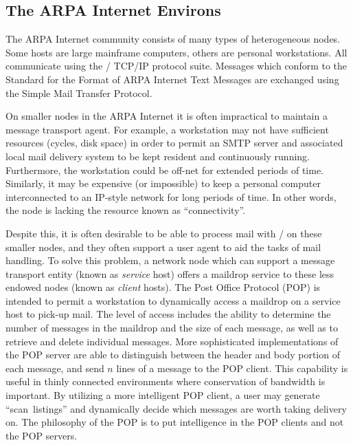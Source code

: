 \subsection{The ARPA Internet Environs}		%
The ARPA Internet community consists of many types of heterogeneous nodes.
Some hosts are large mainframe computers,
others are personal workstations.
All communicate using the \milstd/ TCP/IP protocol suite\cite{IP,TCP}.
Messages which conform to the Standard for the Format of ARPA Internet Text
Messages\cite{DCroc82}
are exchanged using the Simple Mail Transfer Protocol\cite{SMTP}.

On smaller nodes in the ARPA Internet it is often impractical to maintain
a message transport agent.
For example,
a workstation may not have sufficient resources (cycles, disk space)
in order to permit an SMTP server and associated local mail delivery system
to be kept resident and continuously running.
Furthermore,
the workstation could be off-net for extended periods of time.
Similarly,
it may be expensive (or impossible) to keep a personal computer
interconnected to an IP-style network for long periods of time.
In other words,
the node is lacking the resource known as ``connectivity''.

Despite this,
it is often desirable to be able to process mail with \MH/ on these smaller
nodes,
and they often support a user agent to aid the tasks of mail handling.
To solve this problem,
a network node which can support a message transport entity
(known as {\it service} host) offers
a maildrop service to these less endowed nodes
(known as {\it client} hosts).
The Post Office Protocol\cite{JReyn84} (POP) is intended to permit a
workstation to dynamically access a maildrop on a service host to pick-up
mail.%
The level of access includes the ability to
determine the number of messages in the maildrop and the size of each message,
as well as to retrieve and delete individual messages.
More sophisticated implementations of the POP server
are able to distinguish between the header and body portion of each message,
and send $n$ lines of a message to the POP client.
This capability is useful in thinly connected environments where conservation
of bandwidth is important.
By utilizing a more intelligent POP client,
a user may generate ``scan~listings'' and dynamically decide which messages
are worth taking delivery on.
The philosophy of the POP is to put intelligence in the
POP clients and not the POP servers.

